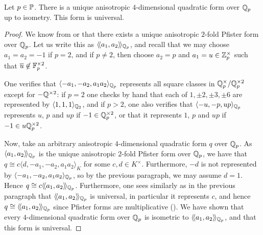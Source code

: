\documentclass[12pt, leqno, british]{amsart}
\begin{document}
\begin{prop}\label{P:classify-4-dimensional-qqp}
Let $p \in \mathbb P$.
There is a unique anisotropic $4$-dimensional quadratic form over $\mathbb Q_p$ up to isometry.
This form is universal.
\end{prop}
\begin{proof}
We know from  or  that there exists a unique anisotropic $2$-fold Pfister form over $\mathbb Q_p$.
Let us write this as $\langle\!\langle a_1, a_2 \rangle\!\rangle_{\mathbb Q_p}$, and recall that we may choose $a_1 = a_2 = -1$ if $p = 2$, and if $p \neq 2$, then choose $a_2 = p$ and $a_1 = u \in \mathbb Z_p^{\times}$ such that $\overline{u} \not\in \mathbb F_p^{\times 2}$.

One verifies that $\langle -a_1, -a_2, a_1a_2 \rangle_{\mathbb Q_p}$ represents all square classes in $\mathbb Q_p^\times/\mathbb Q_p^{\times 2}$ except for $-\mathbb Q^{\times 2}$: if $p = 2$ one checks by hand that each of $1, \pm 2, \pm 3, \pm 6$ are represented by $\langle 1, 1, 1 \rangle_{\mathbb Q_2}$, and if $p > 2$, one also verifies that $\langle -u, -p, up \rangle_{\mathbb Q_p}$ represents $u$, $p$ and $up$ if $-1 \in \mathbb Q_p^{\times 2}$, or that it represents $1$, $p$ and $up$ if $-1 \in u\mathbb Q_p^{\times 2}$.

Now, take an arbitrary anisotropic $4$-dimensional quadratic form $q$ over $\mathbb Q_p$.
As $\langle a_1, a_2 \rangle\!\rangle_{\mathbb Q_p}$ is the unique anisotropic $2$-fold Pfister form over $\mathbb Q_p$, we have that $q \cong c\langle d, -a_1, -a_2, a_1a_2 \rangle_K$ for some $c, d \in K^\times$.
Furthermore, $-d$ is not represented by $\langle -a_1, -a_2, a_1a_2 \rangle_{\mathbb Q_p}$, so by the previous paragraph, we may assume $d = 1$.
Hence $q \cong c\langle\!\langle a_1, a_2 \rangle\!\rangle_{\mathbb Q_p}$.
Furthermore, one sees similarly as in the previous paragraph that $\langle\!\langle a_1, a_2 \rangle\!\rangle_{\mathbb Q_p}$ is universal, in particular it represents $c$, and hence $q \cong \langle\!\langle a_1, a_2 \rangle\!\rangle_{\mathbb Q_p}$ since Pfister forms are multiplicative ().
We have shown that every $4$-dimensional quadratic form over $\mathbb Q_p$ is isometric to $\langle\!\langle a_1, a_2 \rangle\!\rangle_{\mathbb Q_p}$, and that this form is universal.
\end{proof}
\end{document}
